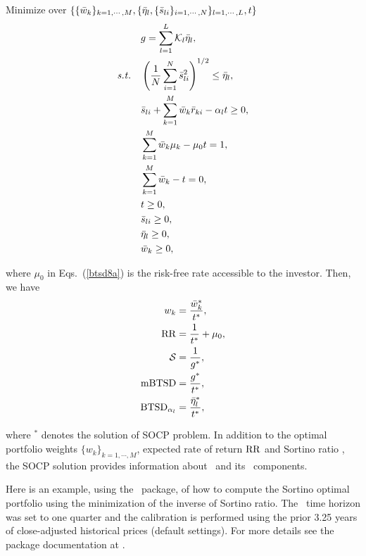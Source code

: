 \bigskip
\noindent Minimize over $\{ \{{\bar w}_k\}_{k=1,\cdots,M}, \{ {\bar \eta}_l, \{ {\bar s}_{li} \}_{i=1,\cdots,N} \}_{l=1,\cdots,L}, t \}$
\begin{subequations}\label{btsd10}
\begin{align}
    &g = \sum_{l=1}^L \cK_l \bbeta_l, \label{btsd10a} \\
    \st &\left( \frac{1}{N}  \sum_{i=1}^N \bs_{li}^2 \right)^{1/2} \leq \bbeta_l, \label{btsd10b} \\
    &\bs_{li}  + \sum_{k=1}^M \bw_k \br_{ki} - \alpha_l t \geq 0, \label{btsd10c} \\
    &\sum_{k=1}^M \bw_k \mu_k -\mu_0 t = 1, \label{btsd10d} \\
    &\sum_{k=1}^M \bw_k - t = 0, \label{btsd10e} \\
    &t \geq 0, \label{btsd10h} \\
    &\bs_{li} \geq 0, \label{btsd10g} \\
    &\bbeta_l \geq 0, \label{btsd10i} \\
    &\bw_k \geq 0, \label{btsd10f}
\end{align}
\end{subequations}

\noindent where $\mu_0$ in Eqs.~(\ref{btsd8a}) is the
risk-free rate accessible to the investor.
Then, we have
\begin{subequations}\label{btsd11}
\begin{align}
    w_k &= \frac{\bw_k^*}{t^*} , \label{btsd11a} \\
    \RR &= \frac{1}{t^*} + \mu_0, \label{btsd11c} \\
    \Sortino &= \frac{1}{g^*}, \label{btsd11b} \\
    \mBTSD &= \frac{g^*}{t^*}, \label{btsd11d} \\
    \BTSD_{\alpha_l} &= \frac{\bbeta_l^*}{t^*}, \label{btsd11e}
\end{align}
\end{subequations}

\noindent where $^*$ denotes the solution of SOCP problem.
In addition to the optimal portfolio weights $\{w_k\}_{k=1,\cdots,M}$, expected rate of return ${\rm RR}$ and
Sortino ratio \Sortino,
the SOCP solution provides information about \mBTSD\ and its \BTSD\ components.

\bigskip
\noindent Here is an example, using the \azapy\ package, of how to compute the Sortino optimal portfolio using the minimization
of the inverse of Sortino ratio.
The \mBTSD\ time horizon was set to one quarter and the calibration is performed using the prior 3.25 years of
close-adjusted historical prices (default settings).
For more details see the package documentation at \azapydoc.

